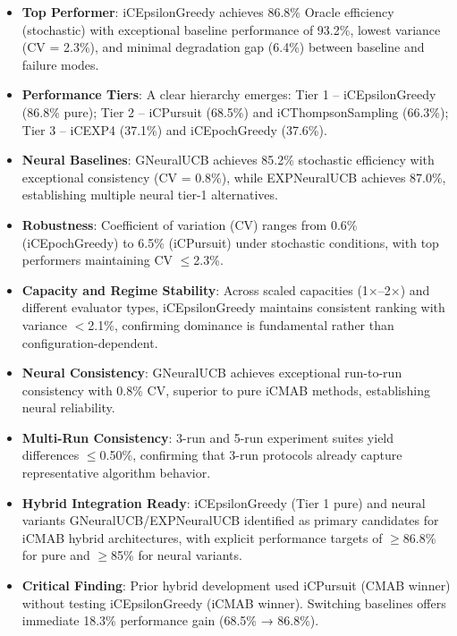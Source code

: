 \documentclass[12pt,a4paper]{article}
\newcommand{\primarytext}[1]{\textcolor{primaryblue}{\textbf{#1}}}
\newcommand{\secondarytext}[1]{\textcolor{secondaryblue}{\textbf{#1}}}
\newcommand{\success}[1]{\textcolor{accentgreen}{\textbf{#1}}}
\newcommand{\warning}[1]{\textcolor{warningred}{\textbf{#1}}}
\newcommand{\neural}[1]{\textcolor{neuralcolor}{\textbf{#1}}}
\begin{document}
\begin{tcolorbox}[colback=highlightgray,colframe=primaryblue,title=\textbf{Executive Summary}]
\begin{itemize}
\item \primarytext{Top Performer}: iCEpsilonGreedy achieves 86.8\% Oracle efficiency (stochastic) with exceptional baseline performance of 93.2\%, lowest variance (CV = 2.3\%), and minimal degradation gap (6.4\%) between baseline and failure modes.
\item \secondarytext{Performance Tiers}: A clear hierarchy emerges: Tier 1 -- iCEpsilonGreedy (86.8\% pure); Tier 2 -- iCPursuit (68.5\%) and iCThompsonSampling (66.3\%); Tier 3 -- iCEXP4 (37.1\%) and iCEpochGreedy (37.6\%).
\item \neural{Neural Baselines}: GNeuralUCB achieves 85.2\% stochastic efficiency with exceptional consistency (CV = 0.8\%), while EXPNeuralUCB achieves 87.0\%, establishing multiple neural tier-1 alternatives.
\item \success{Robustness}: Coefficient of variation (CV) ranges from 0.6\% (iCEpochGreedy) to 6.5\% (iCPursuit) under stochastic conditions, with top performers maintaining CV $\leq$2.3\%.
\item \success{Capacity and Regime Stability}: Across scaled capacities (1$\times$--2$\times$) and different evaluator types, iCEpsilonGreedy maintains consistent ranking with variance $<$2.1\%, confirming dominance is fundamental rather than configuration-dependent.
\item \neural{Neural Consistency}: GNeuralUCB achieves exceptional run-to-run consistency with 0.8\% CV, superior to pure iCMAB methods, establishing neural reliability.
\item \success{Multi-Run Consistency}: 3-run and 5-run experiment suites yield differences $\leq$0.50\%, confirming that 3-run protocols already capture representative algorithm behavior.
\item \primarytext{Hybrid Integration Ready}: iCEpsilonGreedy (Tier 1 pure) and neural variants GNeuralUCB/EXPNeuralUCB identified as primary candidates for iCMAB hybrid architectures, with explicit performance targets of $\geq$86.8\% for pure and $\geq$85\% for neural variants.
\item \warning{Critical Finding}: Prior hybrid development used iCPursuit (CMAB winner) without testing iCEpsilonGreedy (iCMAB winner). Switching baselines offers immediate 18.3\% performance gain (68.5\% → 86.8\%).
\end{itemize}
\end{tcolorbox}
\end{document}
